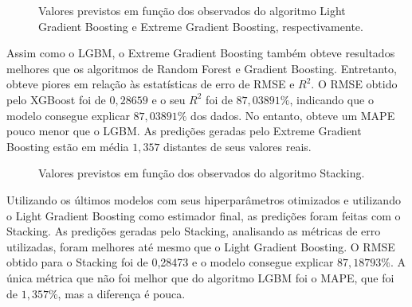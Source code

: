 \documentclass[
  12pt,
  a4paper,
]{scrreprt}
\begin{document}
\begin{figure}
\begin{minipage}{0.50\linewidth}
{}

\subcaption{\label{fig-preds_xgb}}

\end{minipage}%

\caption{\label{fig-preds2}Valores previstos em função dos observados do
algoritmo Light Gradient Boosting e Extreme Gradient Boosting,
respectivamente.}

\end{figure}%

Assim como o LGBM, o Extreme Gradient Boosting também obteve resultados
melhores que os algoritmos de Random Forest e Gradient Boosting.
Entretanto, obteve piores em relação às estatísticas de erro de RMSE e
\(R^2\). O RMSE obtido pelo XGBoost foi de \(0,28659\) e o seu \(R^2\)
foi de \(87,03891\%\), indicando que o modelo consegue explicar
\(87,03891\%\) dos dados. No entanto, obteve um MAPE pouco menor que o
LGBM. As predições geradas pelo Extreme Gradient Boosting estão em média
\(1,357%
\) distantes de seus valores reais.

\begin{figure}


\caption{\label{fig-preds_stacking}Valores previstos em função dos
observados do algoritmo Stacking.}

\end{figure}%

\vspace{12pt}

Utilizando os últimos modelos com seus hiperparâmetros otimizados e
utilizando o Light Gradient Boosting como estimador final, as predições
foram feitas com o Stacking. As predições geradas pelo Stacking,
analisando as métricas de erro utilizadas, foram melhores até mesmo que
o Light Gradient Boosting. O RMSE obtido para o Stacking foi de 0,28473
e o modelo consegue explicar \(87,18793\%\). A única métrica que não foi
melhor que do algoritmo LGBM foi o MAPE, que foi de \(1,357\%\), mas a
diferença é pouca.
\end{document}
